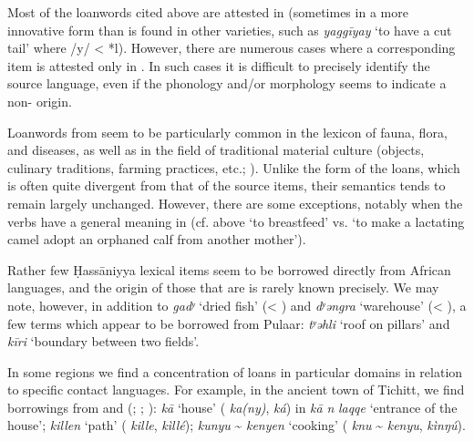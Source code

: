 \documentclass[output=paper]{langsci/langscibook}
\begin{document}
Most of the {loanwords} cited above are attested in  (sometimes in a more innovative form than is found in other  varieties, such as \textit{yaggīyay} ‘to have a cut tail’ where /y/ < *l). However, there are numerous cases where a corresponding  item is attested only in . In such cases it is difficult to precisely identify the {source language}, even if the phonology and/or morphology seems to indicate a non- origin. 

Loanwords from  seem to be particularly common in the lexicon of fauna, flora, and diseases, as well as in the field of traditional material culture (objects, culinary traditions, farming practices, etc.; \citealt{Taine-Cheikh2010lexiques,Taine-Cheikh2014}). Unlike the form of the loans, which is often quite divergent from that of the source items, their semantics tends to remain largely unchanged. However, there are some exceptions, notably when the verbs have a general meaning in  (cf. above `to breastfeed' vs. `to make a lactating camel adopt an orphaned calf from another mother'). 


Rather few Ḥassāniyya lexical items seem to be borrowed directly from African languages, and the origin of those that are is rarely known precisely. We may note, however, in addition to \textit{gadʸ} ‘dried fish’ (< ) and \textit{dʸəngra} ‘warehouse’ (< ), a few terms which appear to be borrowed from Pulaar: \textit{tʸəhli} ‘roof on pillars’ and \textit{kīri} ‘boundary between two fields’.

In some regions we find a concentration of loans in particular domains in relation to specific contact languages. For example, in the ancient town of Tichitt, we find borrowings from  and  (\citealt{Jacques-Meunié1961}; \citealt{Monteil1939}; \citealt{Diagana2013}): \textit{kā} ‘house’ ( \textit{ka(ny)},  \textit{ká}) in \textit{kā} \textit{n} \textit{laqqe} ‘entrance of the house’; \textit{killen} ‘path’ ( \textit{kille},  \textit{kìllé}); \textit{kunyu} \~{} \textit{kenyen} ‘cooking’ ( \textit{knu} \~{} \textit{kenyu},  \textit{kìnŋú}).
\end{document}
